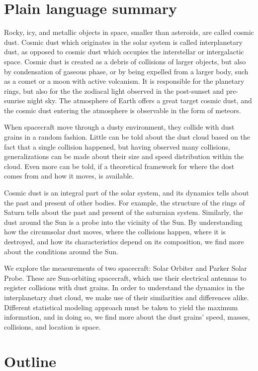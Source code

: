 \section{Plain language summary}

Rocky, icy, and metallic objects in space, smaller than asteroids, are called cosmic dust. Cosmic dust which originates in the solar system is called interplanetary dust, as opposed to cosmic dust which occupies the interstellar or intergalactic space. Cosmic dust is created as a debris of collisions of larger objects, but also by condensation of gaseous phase, or by being expelled from a larger body, such as a comet or a moon with active volcanism. It is responsible for the planetary rings, but also for the the zodiacal light observed in the post-sunset and pre-sunrise night sky. The atmosphere of Earth offers a great target cosmic dust, and the cosmic dust entering the atmosphere is observable in the form of meteors. 

When spacecraft move through a dusty environment, they collide with dust grains in a random fashion. Little can be told about the dust cloud based on the fact that a single collision happened, but having observed many collisions, generalizations can be made about their size and speed distribution within the cloud. Even more can be told, if a theoretical framework for where the dost comes from and how it moves, is available. 

Cosmic dust is an integral part of the solar system, and its dynamics tells about the past and present of other bodies. For example, the structure of the rings of Saturn tells about the past and present of the saturnian system. Similarly, the dust around the Sun is a probe into the vicinity of the Sun. By understanding how the circumsolar dust moves, where the collisions happen, where it is destroyed, and how its characteristics depend on its composition, we find more about the conditions around the Sun. 

We explore the measurements of two spacecraft: Solar Orbiter and Parker Solar Probe. These are Sun-orbiting spacecraft, which use their electrical antennas to register collisions with dust grains. In order to understand the dynamics in the interplanetary dust cloud, we make use of their similarities and differences alike. Different statistical modeling approach must be taken to yield the maximum information, and in doing so, we find more about the dust grains' speed, masses, collisions, and location is space.

\section{Outline}

